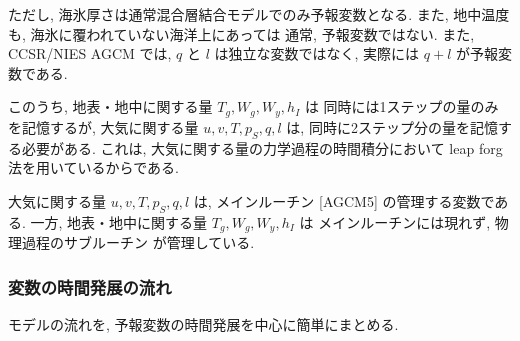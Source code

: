 ただし, 海氷厚さは通常混合層結合モデルでのみ予報変数となる.
また, 地中温度も, 海氷に覆われていない海洋上にあっては
通常, 予報変数ではない.
また, CCSR/NIES AGCM では, $q$ と $l$ は独立な変数ではなく,
実際には $q+l$ が予報変数である.

このうち,
地表・地中に関する量 $T_g, W_g, W_y, h_I$ は
同時には1ステップの量のみを記憶するが,
大気に関する量 $u, v, T, p_S, q, l$ は, 
同時に2ステップ分の量を記憶する必要がある.
これは, 大気に関する量の力学過程の時間積分において
leap forg 法を用いているからである.

大気に関する量 $u, v, T, p_S, q, l$ は,
メインルーチン [AGCM5] の管理する変数である.
一方, 地表・地中に関する量 $T_g, W_g, W_y, h_I$ は
メインルーチンには現れず, 
物理過程のサブルーチン  が管理している.

\subsubsection{変数の時間発展の流れ}

モデルの流れを, 予報変数の時間発展を中心に簡単にまとめる.

